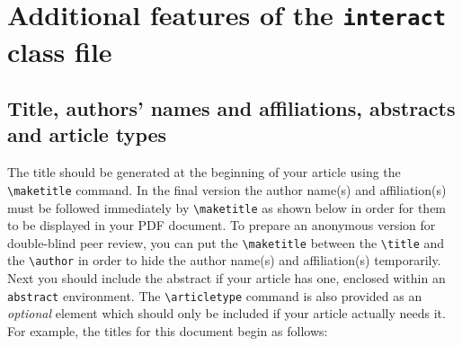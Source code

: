 \documentclass[]{interact}
\theoremstyle{plain}%
\theoremstyle{definition}
\theoremstyle{remark}
\begin{document}


\section{Additional features of the \texttt{interact} class file}

\subsection{Title, authors' names and affiliations, abstracts and article types}

The title should be generated at the beginning of your article using the \verb"\maketitle" command.
In the final version the author name(s) and affiliation(s) must be followed immediately by \verb"\maketitle" as shown below in order for them to be displayed in your PDF document.
To prepare an anonymous version for double-blind peer review, you can put the \verb"\maketitle" between the \verb"\title" and the \verb"\author" in order to hide the author name(s) and affiliation(s) temporarily.
Next you should include the abstract if your article has one, enclosed within an \texttt{abstract} environment.
The \verb"\articletype" command is also provided as an \emph{optional} element which should only be included if your article actually needs it.
For example, the titles for this document begin as follows:
\end{document}

